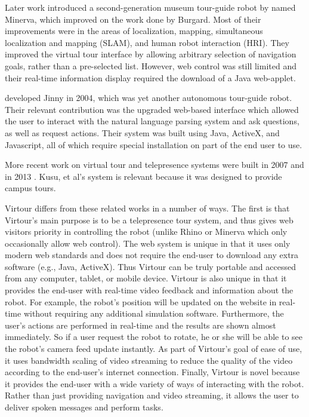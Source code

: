 \documentclass[
  oneside,
  11pt, a4paper,
  footinclude=true,
  headinclude=true,
  cleardoublepage=empty
]{article}
\begin{document}
Later work introduced a second-generation museum tour-guide robot by
\cite{thrun1999} named Minerva, which improved on the work done by Burgard.
Most of their improvements were in the areas of localization, mapping,
simultaneous localization and mapping (SLAM), and human robot interaction
(HRI). They improved the virtual tour interface by allowing arbitrary selection
of navigation goals, rather than a pre-selected list. However, web control was
still limited and their real-time information display required the download of
a Java web-applet.

\cite{kim2004} developed Jinny in 2004, which was yet another autonomous
tour-guide robot. Their relevant contribution was the upgraded web-based
interface which allowed the user to interact with the natural language parsing
system and ask questions, as well as request actions. Their system was built
using Java, ActiveX, and Javascript, all of which require special installation
on part of the end user to use.

More recent work on virtual tour and telepresence systems were built in 2007
\cite{michaud2007} and in 2013 \cite{kusu2013}. Kusu, et al's system is relevant
because it was designed to provide campus tours.

Virtour differs from these related works in a number of ways. The first is that
Virtour's main purpose is to be a telepresence tour system, and thus gives web
visitors priority in controlling the robot (unlike Rhino or Minerva which only
occasionally allow web control). The web system is unique in that it uses only
modern web standards and does not require the end-user to download any extra
software (e.g., Java, ActiveX). Thus Virtour can be truly portable and accessed
from any computer, tablet, or mobile device. Virtour is also unique in that it
provides the end-user with real-time video feedback and information about the
robot. For example, the robot's position will be updated on the website in
real-time without requiring any additional simulation software. Furthermore,
the user's actions are performed in real-time and the results are shown almost
immediately. So if a user request the robot to rotate, he or she will be able
to see the robot's camera feed update instantly.  As part of Virtour's goal of
ease of use, it uses bandwidth scaling of video streaming to reduce the quality
of the video according to the end-user's internet connection. Finally, Virtour
is novel because it provides the end-user with a wide variety of ways of
interacting with the robot. Rather than just providing navigation and video
streaming, it allows the user to deliver spoken messages and perform tasks.
\end{document}
